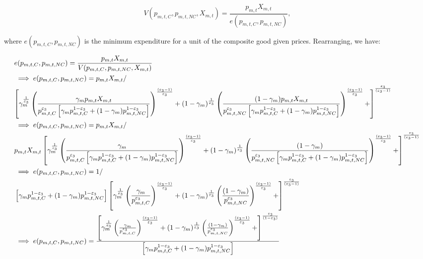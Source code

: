 \begin{equation}
V(p_{m,t,C},p_{m,t,NC}, X_{m,t}) = \frac{p_{m,t}X_{m,t}}{e(p_{m,t,C},p_{m,t,NC})},
\end{equation}
    
    
\noindent\noindent where $e(p_{m,t,C},p_{m,t,NC})$ is the minimum expenditure for a unit of the composite good given prices.  Rearranging, we have: 
    
 \begin{equation}
 \label{eqn:price_comp}
 \begin{split}
& e(p_{m,t,C},p_{m,t,NC}) = \frac{p_{m,t}X_{m,t}}{V(p_{m,t,C},p_{m,t,NC}, X_{m,t})}\\
&\implies e(p_{m,t,C},p_{m,t,NC}) = p_{m,t}X_{m,t}/ \\
& {\left[\gamma_{m}^{\frac{1}{\ve_{3}}}\left( \frac{\gamma_{m}p_{m,t}X_{m,t}}{p_{m,t,C}^{\ve_{3}}\left[\gamma_{m}p_{m,t,C}^{1-\ve_{3}}+(1-\gamma_{m})p_{m,t,NC}^{1-\ve_{3}}\right]}\right)^{\frac{(\ve_{3}-1)}{\ve_{3}}}+(1-\gamma_{m})^{\frac{1}{\ve_{3}}}\left(\frac{(1-\gamma_{m})p_{m,t}X_{m,t}}{p_{m,t,NC}^{\ve_{3}}\left[\gamma_{m}p_{m,t,C}^{1-\ve_{3}}+(1-\gamma_{m})p_{m,t,NC}^{1-\ve_{3}}\right]}\right)^{\frac{(\ve_{3}-1)}{\ve_{3}}}+\right]^{\frac{\ve_{3}}{(\ve_{3}-1)}}}\\
&\implies e(p_{m,t,C},p_{m,t,NC}) = p_{m,t}X_{m,t}/ \\
& {p_{m,t}X_{m,t}\left[\gamma_{m}^{\frac{1}{\ve_{3}}}\left( \frac{\gamma_{m}}{p_{m,t,C}^{\ve_{3}}\left[\gamma_{m}p_{m,t,C}^{1-\ve_{3}}+(1-\gamma_{m})p_{m,t,NC}^{1-\ve_{3}}\right]}\right)^{\frac{(\ve_{3}-1)}{\ve_{3}}}+(1-\gamma_{m})^{\frac{1}{\ve_{3}}}\left(\frac{(1-\gamma_{m})}{p_{m,t,NC}^{\ve_{3}}\left[\gamma_{m}p_{m,t,C}^{1-\ve_{3}}+(1-\gamma_{m})p_{m,t,NC}^{1-\ve_{3}}\right]}\right)^{\frac{(\ve_{3}-1)}{\ve_{3}}}+\right]^{\frac{\ve_{3}}{(\ve_{3}-1)}}}\\
&\implies e(p_{m,t,C},p_{m,t,NC}) = 1/ \\
& \left[\gamma_{m}p_{m,t,C}^{1-\ve_{3}}+(1-\gamma_{m})p_{m,t,NC}^{1-\ve_{3}}\right]{\left[\gamma_{m}^{\frac{1}{\ve_{3}}}\left( \frac{\gamma_{m}}{p_{m,t,C}^{\ve_{3}}}\right)^{\frac{(\ve_{3}-1)}{\ve_{3}}}+(1-\gamma_{m})^{\frac{1}{\ve_{3}}}\left(\frac{(1-\gamma_{m})}{p_{m,t,NC}^{\ve_{3}}}\right)^{\frac{(\ve_{3}-1)}{\ve_{3}}}+\right]^{\frac{\ve_{3}}{(\ve_{3}-1)}}}\\
&\implies e(p_{m,t,C},p_{m,t,NC}) = 
\frac{\left[\gamma_{m}^{\frac{1}{\ve_{3}}}\left( \frac{\gamma_{m}}{p_{m,t,C}^{\ve_{3}}}\right)^{\frac{(\ve_{3}-1)}{\ve_{3}}}+(1-\gamma_{m})^{\frac{1}{\ve_{3}}}\left(\frac{(1-\gamma_{m})}{p_{m,t,NC}^{\ve_{3}}}\right)^{\frac{(\ve_{3}-1)}{\ve_{3}}}+\right]^{\frac{\ve_{3}}{(1-\ve_{3})}}}{\left[\gamma_{m}p_{m,t,C}^{1-\ve_{3}}+(1-\gamma_{m})p_{m,t,NC}^{1-\ve_{3}}\right]}\\

\end{split}
\end{equation}

